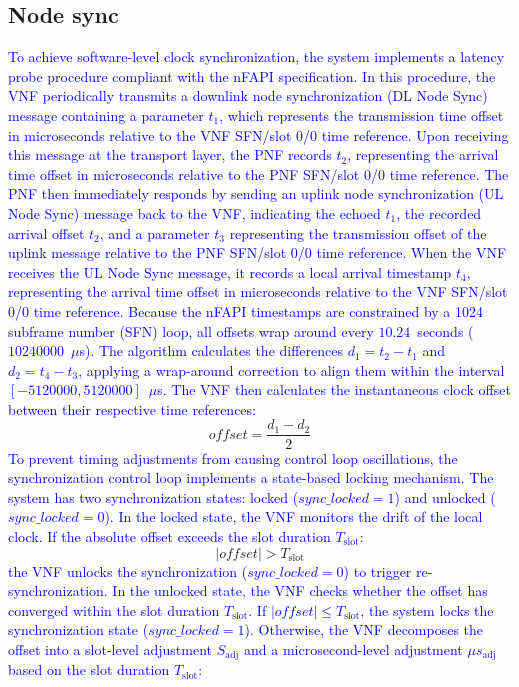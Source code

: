 \documentclass[10pt, conference, letterpaper]{IEEEtran}
\begin{document}
\subsection{Node sync}
\label{subsec:node_sync}
\textcolor{blue}{To achieve software-level clock synchronization, the system implements a latency probe procedure compliant with the nFAPI specification. In this procedure, the VNF periodically transmits a downlink node synchronization (DL Node Sync) message containing a parameter $t_1$, which represents the transmission time offset in microseconds relative to the VNF SFN/slot 0/0 time reference. Upon receiving this message at the transport layer, the PNF records $t_2$, representing the arrival time offset in microseconds relative to the PNF SFN/slot 0/0 time reference. The PNF then immediately responds by sending an uplink node synchronization (UL Node Sync) message back to the VNF, indicating the echoed $t_1$, the recorded arrival offset $t_2$, and a parameter $t_3$ representing the transmission offset of the uplink message relative to the PNF SFN/slot 0/0 time reference. When the VNF receives the UL Node Sync message, it records a local arrival timestamp $t_4$, representing the arrival time offset in microseconds relative to the VNF SFN/slot 0/0 time reference. Because the nFAPI timestamps are constrained by a 1024 subframe number (SFN) loop, all offsets wrap around every $10.24$~seconds ($10240000$~$\mu$s). The algorithm calculates the differences $d_1 = t_2 - t_1$ and $d_2 = t_4 - t_3$, applying a wrap-around correction to align them within the interval $[-5120000, 5120000]$~$\mu$s. The VNF then calculates the instantaneous clock offset between their respective time references:}
\begin{equation}
\mathit{offset} = \frac{d_1 - d_2}{2}
\end{equation}
\textcolor{blue}{To prevent timing adjustments from causing control loop oscillations, the synchronization control loop implements a state-based locking mechanism. The system has two synchronization states: locked ($\mathit{sync\_locked} = 1$) and unlocked ($\mathit{sync\_locked} = 0$). In the locked state, the VNF monitors the drift of the local clock. If the absolute offset exceeds the slot duration $T_{\mathrm{slot}}$:}
\begin{equation}
|\mathit{offset}| > T_{\mathrm{slot}}
\end{equation}
\textcolor{blue}{the VNF unlocks the synchronization ($\mathit{sync\_locked} = 0$) to trigger re-synchronization. In the unlocked state, the VNF checks whether the offset has converged within the slot duration $T_{\mathrm{slot}}$. If $|\mathit{offset}| \le T_{\mathrm{slot}}$, the system locks the synchronization state ($\mathit{sync\_locked} = 1$). Otherwise, the VNF decomposes the offset into a slot-level adjustment $S_{\mathrm{adj}}$ and a microsecond-level adjustment $\mu s_{\mathrm{adj}}$ based on the slot duration $T_{\mathrm{slot}}$:}
\end{document}
